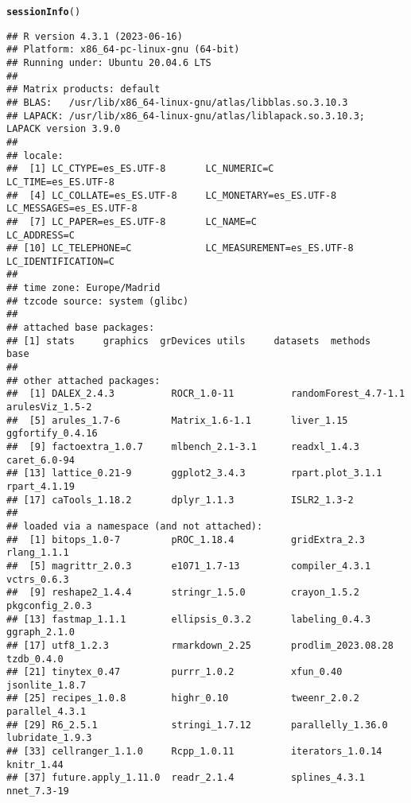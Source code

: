 \documentclass{article}\usepackage[]{graphicx}\usepackage[]{xcolor}
\makeatletter
\newcommand{\hlstd}[1]{\textcolor[rgb]{0.345,0.345,0.345}{#1}}%
\newcommand{\hlkwd}[1]{\textcolor[rgb]{0.737,0.353,0.396}{\textbf{#1}}}%
\newenvironment{kframe}{%
 \def\at@end@of@kframe{}%
 \ifinner\ifhmode%
  \def\at@end@of@kframe{\end{minipage}}%
  \begin{minipage}{\columnwidth}%
 \fi\fi%
 \def\FrameCommand##1{\hskip\@totalleftmargin \hskip-\fboxsep
 \colorbox{shadecolor}{##1}\hskip-\fboxsep
     \hskip-\linewidth \hskip-\@totalleftmargin \hskip\columnwidth}%
 \MakeFramed {\advance\hsize-\width
   \@totalleftmargin\z@ \linewidth\hsize
   \@setminipage}}%
 {\par\unskip\endMakeFramed%
 \at@end@of@kframe}
\newenvironment{knitrout}{}{} %
\makeatother
\begin{document}
\begin{knitrout}
\color{fgcolor}\begin{kframe}
\begin{alltt}
\hlkwd{sessionInfo}\hlstd{()}
\end{alltt}
\begin{verbatim}
## R version 4.3.1 (2023-06-16)
## Platform: x86_64-pc-linux-gnu (64-bit)
## Running under: Ubuntu 20.04.6 LTS
## 
## Matrix products: default
## BLAS:   /usr/lib/x86_64-linux-gnu/atlas/libblas.so.3.10.3 
## LAPACK: /usr/lib/x86_64-linux-gnu/atlas/liblapack.so.3.10.3;  LAPACK version 3.9.0
## 
## locale:
##  [1] LC_CTYPE=es_ES.UTF-8       LC_NUMERIC=C               LC_TIME=es_ES.UTF-8       
##  [4] LC_COLLATE=es_ES.UTF-8     LC_MONETARY=es_ES.UTF-8    LC_MESSAGES=es_ES.UTF-8   
##  [7] LC_PAPER=es_ES.UTF-8       LC_NAME=C                  LC_ADDRESS=C              
## [10] LC_TELEPHONE=C             LC_MEASUREMENT=es_ES.UTF-8 LC_IDENTIFICATION=C       
## 
## time zone: Europe/Madrid
## tzcode source: system (glibc)
## 
## attached base packages:
## [1] stats     graphics  grDevices utils     datasets  methods   base     
## 
## other attached packages:
##  [1] DALEX_2.4.3          ROCR_1.0-11          randomForest_4.7-1.1 arulesViz_1.5-2     
##  [5] arules_1.7-6         Matrix_1.6-1.1       liver_1.15           ggfortify_0.4.16    
##  [9] factoextra_1.0.7     mlbench_2.1-3.1      readxl_1.4.3         caret_6.0-94        
## [13] lattice_0.21-9       ggplot2_3.4.3        rpart.plot_3.1.1     rpart_4.1.19        
## [17] caTools_1.18.2       dplyr_1.1.3          ISLR2_1.3-2         
## 
## loaded via a namespace (and not attached):
##  [1] bitops_1.0-7         pROC_1.18.4          gridExtra_2.3        rlang_1.1.1         
##  [5] magrittr_2.0.3       e1071_1.7-13         compiler_4.3.1       vctrs_0.6.3         
##  [9] reshape2_1.4.4       stringr_1.5.0        crayon_1.5.2         pkgconfig_2.0.3     
## [13] fastmap_1.1.1        ellipsis_0.3.2       labeling_0.4.3       ggraph_2.1.0        
## [17] utf8_1.2.3           rmarkdown_2.25       prodlim_2023.08.28   tzdb_0.4.0          
## [21] tinytex_0.47         purrr_1.0.2          xfun_0.40            jsonlite_1.8.7      
## [25] recipes_1.0.8        highr_0.10           tweenr_2.0.2         parallel_4.3.1      
## [29] R6_2.5.1             stringi_1.7.12       parallelly_1.36.0    lubridate_1.9.3     
## [33] cellranger_1.1.0     Rcpp_1.0.11          iterators_1.0.14     knitr_1.44          
## [37] future.apply_1.11.0  readr_2.1.4          splines_4.3.1        nnet_7.3-19         

\end{verbatim}
\end{kframe}
\end{knitrout}
\end{document}
